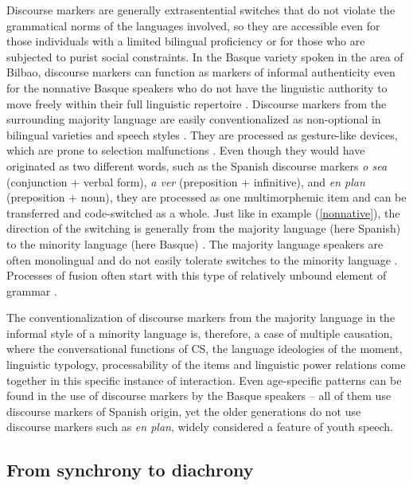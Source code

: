 \documentclass[output=paper]{langscibook}
\begin{document}
Discourse markers are generally extrasentential switches that do not violate the grammatical norms of the languages involved, so they are accessible even for those individuals with a limited bilingual proficiency or for those who are subjected to purist social constraints. In the Basque variety spoken in the area of Bilbao, discourse markers can function as markers of informal authenticity even for the nonnative Basque speakers who do not have the linguistic authority to move freely within their full linguistic repertoire \parencite{lantto2018new}. Discourse markers from the surrounding majority language are easily conventionalized as non-optional in bilingual varieties and speech styles \parencite{goss2000evolution,matras2009language}. They are processed as gesture-like devices, which are prone to selection malfunctions \parencite{matras2009language}. Even though they would have originated as two different words, such as the Spanish discourse markers \textit{o sea} (conjunction + verbal form), \textit{a ver} (preposition + infinitive), and \textit{en plan} (preposition + noun), they are processed as one multimorphemic item and can be transferred and code-switched as a whole. Just like in example (\ref{nonnative}), the direction of the switching is generally from the majority language (here Spanish) to the minority language (here Basque) \parencite{matras2009language}. The majority language speakers are often monolingual and do not easily tolerate switches to the minority language \parencite{matras2009language}. Processes of fusion often start with this type of relatively unbound element of grammar \parencite{auer1999codeswitching}.

The conventionalization of discourse markers from the majority language in the informal style of a minority language is, therefore, a case of multiple causation, where the conversational functions of CS, the language ideologies of the moment, linguistic typology, processability of the items and linguistic power relations come together in this specific instance of interaction. Even age-specific patterns can be found in the use of discourse markers by the Basque speakers – all of them use discourse markers of Spanish origin, yet the older generations do not use discourse markers such as \textit{en plan}, widely considered a feature of youth speech.

\subsection{From synchrony to diachrony} 
\end{document}
